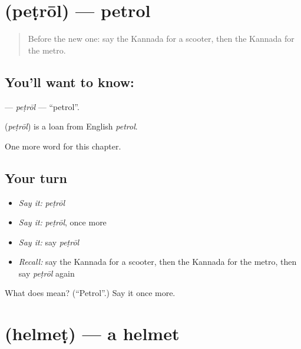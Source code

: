 \section[\texorpdfstring{\kn{ಪೆಟ್ರೋಲ್} (peṭrōl)}{ಪೆಟ್ರೋಲ್ (peṭrōl)}]{ (peṭrōl) — petrol}

\label{lesson:KA-C296-petrol}



\begin{quote}
Before the new one: say the Kannada for a scooter, then the Kannada for the metro.
\end{quote}

\subsection*{You'll want to know: }
\textbf{} — \emph{peṭrōl} — \textquotedblleft{}petrol\textquotedblright{}.

\begin{cousinweb}
\textbf{} (\emph{peṭrōl}) is a loan from English \emph{petrol}.
\end{cousinweb}

\begin{grammarlens}[title={What you've built}]
One more word for this chapter.
\end{grammarlens}

\subsection*{Your turn}
\begin{itemize}
\raggedright
  \item \emph{Say it:} \emph{peṭrōl}
  \item \emph{Say it:} \emph{peṭrōl}, once more
  \item \emph{Say it:} say \emph{peṭrōl}
  \item \emph{Recall:} say the Kannada for a scooter, then the Kannada for the metro, then say \emph{peṭrōl} again
\end{itemize}

\begin{tcolorbox}[breakable,colback=teal!4,colframe=teal!35!black,title={Before you move on}]
What does  mean? (\textquotedblleft{}Petrol\textquotedblright{}.) Say it once more.
\end{tcolorbox}
\section[\texorpdfstring{\kn{ಹೆಲ್ಮೆಟ್} (helmeṭ)}{ಹೆಲ್ಮೆಟ್ (helmeṭ)}]{ (helmeṭ) — a helmet}

